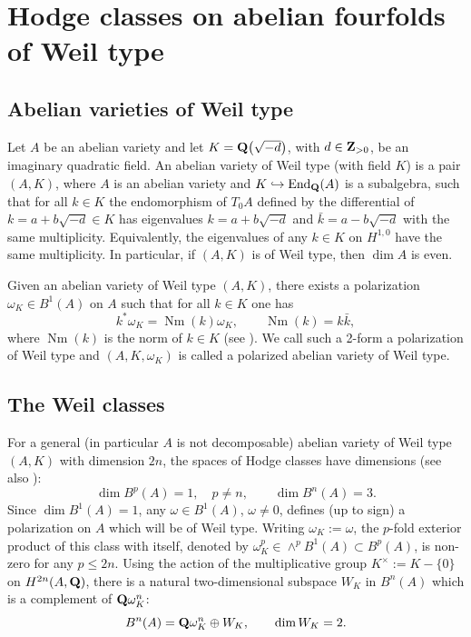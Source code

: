 \documentclass[pdftex]{sigma}
\numberwithin{equation}{section}
\begin{document}
\section{Hodge classes on abelian fourfolds of Weil type}\label{ab4w}

\subsection{Abelian varieties of Weil type}
Let $A$ be an abelian variety and let $K={\bf Q}\big(\sqrt{-d}\big)$, with $d\in{\bf Z}_{>0}$,
be an imaginary quadratic field. An abelian variety of Weil type (with field
$K$) is a pair $(A,K)$, where $A$ is an abelian variety and $K\hookrightarrow \operatorname{End}_{\bf Q}(A)$
is a subalgebra, such that for all $k\in K$
the endomorphism of $T_0A$
defined by the differential of $k=a+b\sqrt{-d}\in K$
has eigenvalues $k=a+b\sqrt{-d}$ and $\bar{k}=a-b\sqrt{-d}$ with the same multiplicity.
Equivalently, the eigenvalues of any $k\in K$ on $H^{1,0}$ have the same multiplicity.
In particular, if $(A,K)$ is of Weil type, then $\dim A$ is even.

Given an abelian variety of Weil type $(A,K)$,
there exists a polarization $\omega_K\in B^1(A)$ on $A$
such that for all $k\in K$ one has
\[
k^*\omega_K = \operatorname{Nm}(k)\omega_K,\qquad \operatorname{Nm}(k) = k\bar{k},
\]
where $\operatorname{Nm}(k)$ is the norm of $k\in K$ (see \cite[Lemma 5.2.1]{hcav}).
We call such a 2-form a polarization of Weil type and
$(A,K,\omega_K)$ is called a polarized abelian variety of Weil type.

\subsection{The Weil classes}
For a general (in particular $A$ is not decomposable) abelian variety of Weil type
$(A,K)$ with dimension $2n$, the spaces of Hodge classes have dimensions
\cite{Weil} (see also \cite[Theorem~6.12]{hcav}):
\[
\dim B^p(A) = 1,\quad p\ne n,\qquad \dim B^n(A) = 3.
\]
Since $\dim B^1(A)=1$, any $\omega\in B^1(A)$, $\omega\ne 0$,
defines (up to sign) a polarization on $A$ which will be of Weil type.
Writing $\omega_K:=\omega$, the $p$-fold exterior product of this class with itself,
denoted by $\omega_K^p\in \wedge^pB^1(A)\subset B^p(A)$, is non-zero
for any $p\leq 2n$.
Using the action of the multiplicative group $K^\times:=K-\{0\}$ on $H^{2n}(A,{\bf Q})$,
there is a natural two-dimensional subspace $W_K$
in $B^n(A)$ which is a complement of ${\bf Q}\omega_K^n$:
\[
B^n(A) = {\bf Q}\omega_K^n \oplus W_K,\qquad \dim W_K = 2.
\]
\end{document}
